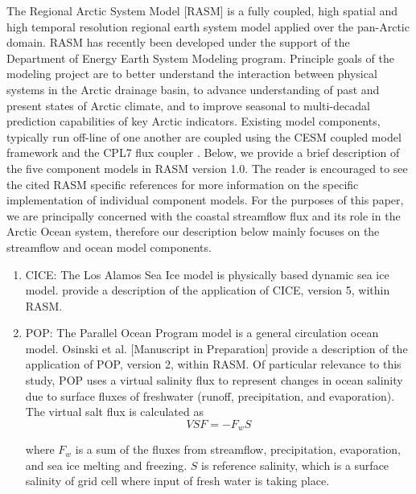 \documentclass[jgrga, draft]{agutex}
\begin{document}
\begin{article}
The Regional Arctic System Model [RASM] is a fully coupled, high spatial and high temporal resolution regional earth system model applied over the pan-Arctic domain.
RASM has recently been developed under the support of the Department of Energy Earth System Modeling program.
Principle goals of the modeling project are to better understand the interaction between physical systems in the Arctic drainage basin, to advance understanding of past and present states of Arctic climate, and to improve seasonal to multi-decadal prediction capabilities of key Arctic indicators.
Existing model components, typically run off-line of one another are coupled using the CESM coupled model framework and the CPL7 flux coupler \citep{Craig_2011}.
Below, we provide a brief description of the five component models in RASM version 1.0.
The reader is encouraged to see the cited RASM specific references for more information on the specific implementation of individual component models.
For the purposes of this paper, we are principally concerned with the coastal streamflow flux and its role in the Arctic Ocean system, therefore our description below mainly focuses on the streamflow and ocean model components.

\begin{enumerate}
\item CICE: The Los Alamos Sea Ice model \citep{Hunke_2010} is physically based dynamic sea ice model.
\citet{Roberts_2015b} provide a description of the application of CICE, version 5, within RASM.
\item POP: The Parallel Ocean Program model \citep{Smith_2010} is a general circulation ocean model.
Osinski et al. [Manuscript in Preparation] provide a description of the application of POP, version 2, within RASM.
Of particular relevance to this study, POP uses a virtual salinity flux to represent changes in ocean salinity due to surface fluxes of freshwater (runoff, precipitation, and evaporation).
The virtual salt flux is calculated as
\begin{equation}
     VSF= -F_w S
\end{equation}

where $F_w$ is a sum of the fluxes from streamflow, precipitation, evaporation, and sea ice melting and freezing. $S$ is reference salinity, which is a surface salinity of grid cell where input of fresh water is taking place.


\end{enumerate}
\end{article}
\end{document}
